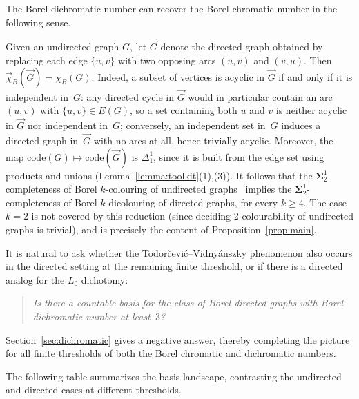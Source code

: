 The Borel dichromatic number can recover the Borel chromatic number in the following sense.

\begin{remark}\label{rmk:dichrom-recovers-chrom}
	Given an undirected graph $G$, let $\vec{G}$ denote the directed graph obtained by replacing each edge $\{u,v\}$ with two opposing arcs $(u,v)$ and $(v,u)$.
	Then $\vec\chi_B(\vec{G}) = \chi_B(G)$.
	Indeed, a subset of vertices is acyclic in $\vec{G}$ if and only if it is independent in~$G$: any directed cycle in $\vec{G}$ would in particular contain an arc $(u,v)$ with $\{u,v\}\in E(G)$, so a set containing both $u$ and $v$ is neither acyclic in $\vec{G}$ nor independent in~$G$; conversely, an independent set in~$G$ induces a directed graph in~$\vec{G}$ with no arcs at all, hence trivially acyclic.
	Moreover, the map $\mathrm{code}(G)\mapsto\mathrm{code}(\vec{G})$ is $\Delta^1_1$, since it is built from the edge set using products and unions (Lemma~\ref{lemma:toolkit}(1),(3)).
	It follows that the $\mathbf\Sigma^1_2$-completeness of Borel $k$-colouring of undirected graphs~\cite{Todorcevic_2021_ComplexProbBorel} implies the $\mathbf\Sigma^1_2$-completeness of Borel $k$-dicolouring of directed graphs, for every $k\geq 4$.
	The case $k=2$ is not covered by this reduction (since deciding 2-colourability of undirected graphs is trivial), and is precisely the content of Proposition~\ref{prop:main}.
\end{remark}

It is natural to ask whether the Todorčević--Vidnyánszky phenomenon also occurs in the directed setting at the remaining finite threshold, or if there is a directed analog for the $L_0$ dichotomy:

\begin{quote}
\emph{Is there a countable basis for the class of Borel directed graphs with Borel dichromatic number at least~$3$?}
\end{quote}

Section~\ref{sec:dichromatic} gives a negative answer, thereby completing the picture for all finite thresholds of both the Borel chromatic and dichromatic numbers.

The following table summarizes the basis landscape, contrasting the undirected and directed cases at different thresholds.


